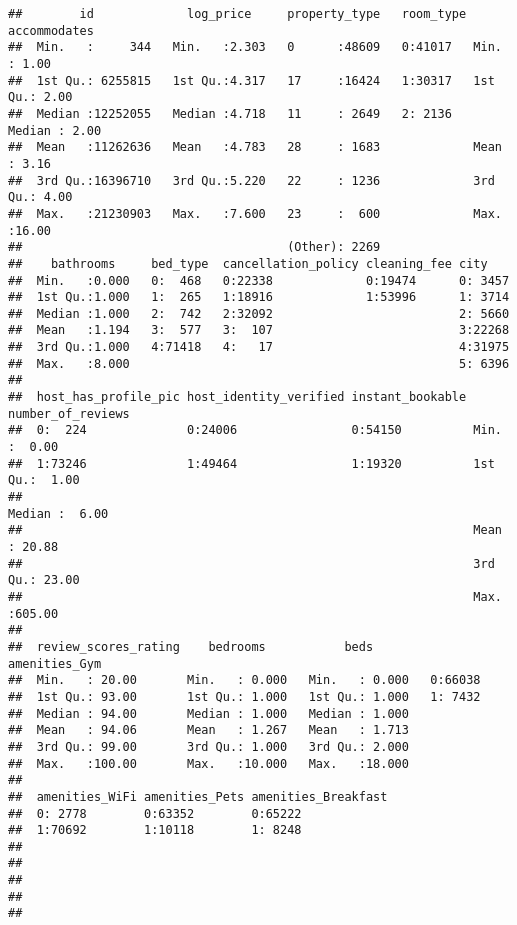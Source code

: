 \documentclass[
]{article}
\begin{document}
\begin{verbatim}
##        id             log_price     property_type   room_type  accommodates  
##  Min.   :     344   Min.   :2.303   0      :48609   0:41017   Min.   : 1.00  
##  1st Qu.: 6255815   1st Qu.:4.317   17     :16424   1:30317   1st Qu.: 2.00  
##  Median :12252055   Median :4.718   11     : 2649   2: 2136   Median : 2.00  
##  Mean   :11262636   Mean   :4.783   28     : 1683             Mean   : 3.16  
##  3rd Qu.:16396710   3rd Qu.:5.220   22     : 1236             3rd Qu.: 4.00  
##  Max.   :21230903   Max.   :7.600   23     :  600             Max.   :16.00  
##                                     (Other): 2269                            
##    bathrooms     bed_type  cancellation_policy cleaning_fee city     
##  Min.   :0.000   0:  468   0:22338             0:19474      0: 3457  
##  1st Qu.:1.000   1:  265   1:18916             1:53996      1: 3714  
##  Median :1.000   2:  742   2:32092                          2: 5660  
##  Mean   :1.194   3:  577   3:  107                          3:22268  
##  3rd Qu.:1.000   4:71418   4:   17                          4:31975  
##  Max.   :8.000                                              5: 6396  
##                                                                      
##  host_has_profile_pic host_identity_verified instant_bookable number_of_reviews
##  0:  224              0:24006                0:54150          Min.   :  0.00   
##  1:73246              1:49464                1:19320          1st Qu.:  1.00   
##                                                               Median :  6.00   
##                                                               Mean   : 20.88   
##                                                               3rd Qu.: 23.00   
##                                                               Max.   :605.00   
##                                                                                
##  review_scores_rating    bedrooms           beds        amenities_Gym
##  Min.   : 20.00       Min.   : 0.000   Min.   : 0.000   0:66038      
##  1st Qu.: 93.00       1st Qu.: 1.000   1st Qu.: 1.000   1: 7432      
##  Median : 94.00       Median : 1.000   Median : 1.000                
##  Mean   : 94.06       Mean   : 1.267   Mean   : 1.713                
##  3rd Qu.: 99.00       3rd Qu.: 1.000   3rd Qu.: 2.000                
##  Max.   :100.00       Max.   :10.000   Max.   :18.000                
##                                                                      
##  amenities_WiFi amenities_Pets amenities_Breakfast
##  0: 2778        0:63352        0:65222            
##  1:70692        1:10118        1: 8248            
##                                                   
##                                                   
##                                                   
##                                                   
## 
\end{verbatim}
\end{document}
